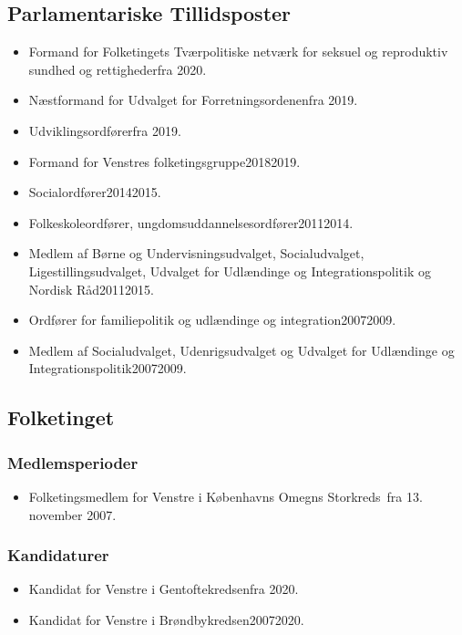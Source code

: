 \documentclass[11pt, a4paper]{awesome-cv}
\begin{document}
\begin{cvletter}
\subsection*{Parlamentariske Tillidsposter}
\begin{itemize}
\item Formand for Folketingets Tværpolitiske netværk for seksuel og reproduktiv sundhed og rettighederfra 2020.
\item Næstformand for Udvalget for Forretningsordenenfra 2019.
\item Udviklingsordførerfra 2019.
\item Formand for Venstres folketingsgruppe20182019.
\item Socialordfører20142015.
\item Folkeskoleordfører, ungdomsuddannelsesordfører20112014.
\item Medlem af Børne og Undervisningsudvalget, Socialudvalget, Ligestillingsudvalget, Udvalget for Udlændinge og Integrationspolitik og Nordisk Råd20112015.
\item Ordfører for familiepolitik og udlændinge og integration20072009.
\item Medlem af Socialudvalget, Udenrigsudvalget og Udvalget for Udlændinge og Integrationspolitik20072009.
\end{itemize}
\subsection*{Folketinget}
\subsubsection*{Medlemsperioder}
\begin{itemize}
\item Folketingsmedlem for Venstre i Københavns Omegns Storkreds fra 13. november 2007.
\end{itemize}
\subsubsection*{Kandidaturer}
\begin{itemize}
\item Kandidat for Venstre i Gentoftekredsenfra 2020.
\item Kandidat for Venstre i Brøndbykredsen20072020.
\end{itemize}

\end{cvletter}
\end{document}

